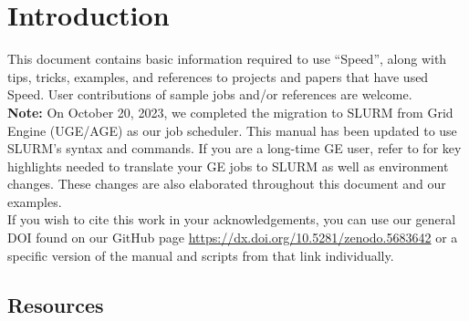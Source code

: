 \documentclass{easychair}
\begin{document}
\tableofcontents
\clearpage

\section{Introduction}
\label{sect:introduction}

This document contains basic information required to use ``Speed'', along with tips, 
tricks, examples, and references to projects and papers that have used Speed.
User contributions of sample jobs and/or references are welcome. \\

\noindent \textbf{Note:} On October 20, 2023, we completed the migration to SLURM 
from Grid Engine (UGE/AGE) as our job scheduler. 
This manual has been updated to use SLURM’s syntax and commands. 
If you are a long-time GE user, refer to  for key highlights needed to 
translate your GE jobs to SLURM as well as environment changes. 
These changes are also elaborated throughout this document and our examples.\\

If you wish to cite this work in your acknowledgements, you can use our general DOI found on our GitHub page
\url{https://dx.doi.org/10.5281/zenodo.5683642} or a specific version of the manual and scripts from that link individually.

\subsection{Resources}
\label{sect:resources}
\end{document}
